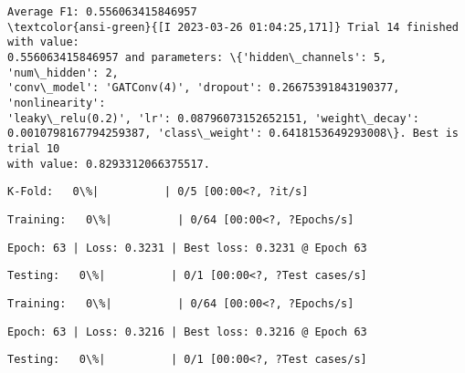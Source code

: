 \documentclass[11pt]{article}
\begin{document}
    
    \begin{Verbatim}[commandchars=\\\{\}]
Average F1: 0.556063415846957
\textcolor{ansi-green}{[I 2023-03-26 01:04:25,171]} Trial 14 finished with value:
0.556063415846957 and parameters: \{'hidden\_channels': 5, 'num\_hidden': 2,
'conv\_model': 'GATConv(4)', 'dropout': 0.26675391843190377, 'nonlinearity':
'leaky\_relu(0.2)', 'lr': 0.08796073152652151, 'weight\_decay':
0.0010798167794259387, 'class\_weight': 0.6418153649293008\}. Best is trial 10
with value: 0.8293312066375517.
    \end{Verbatim}

    
    \begin{Verbatim}[commandchars=\\\{\}]
K-Fold:   0\%|          | 0/5 [00:00<?, ?it/s]
    \end{Verbatim}

    
    
    \begin{Verbatim}[commandchars=\\\{\}]
Training:   0\%|          | 0/64 [00:00<?, ?Epochs/s]
    \end{Verbatim}

    
    \begin{Verbatim}[commandchars=\\\{\}]
Epoch: 63 | Loss: 0.3231 | Best loss: 0.3231 @ Epoch 63
    \end{Verbatim}

    
    \begin{Verbatim}[commandchars=\\\{\}]
Testing:   0\%|          | 0/1 [00:00<?, ?Test cases/s]
    \end{Verbatim}

    
    
    \begin{Verbatim}[commandchars=\\\{\}]
Training:   0\%|          | 0/64 [00:00<?, ?Epochs/s]
    \end{Verbatim}

    
    \begin{Verbatim}[commandchars=\\\{\}]
Epoch: 63 | Loss: 0.3216 | Best loss: 0.3216 @ Epoch 63
    \end{Verbatim}

    
    \begin{Verbatim}[commandchars=\\\{\}]
Testing:   0\%|          | 0/1 [00:00<?, ?Test cases/s]
    \end{Verbatim}
\end{document}
